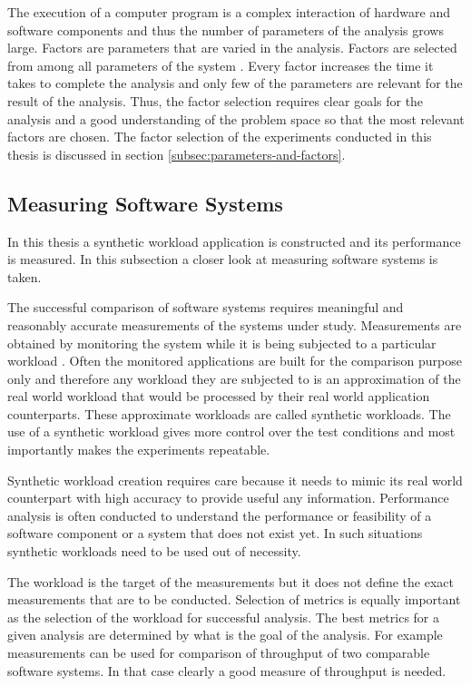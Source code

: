 The execution of a computer program is a complex interaction of hardware and software components and thus the number of parameters of the analysis grows large. Factors are parameters that are varied in the analysis. Factors are selected from among all parameters of the system \cite{jain1991art}. Every factor increases the time it takes to complete the analysis and only few of the parameters are relevant for the result of the analysis. Thus, the factor selection requires clear goals for the analysis and a good understanding of the problem space so that the most relevant factors are chosen. The factor selection of the experiments conducted in this thesis is discussed in section \ref{subsec:parameters-and-factors}.

\subsection{Measuring Software Systems}
\label{subsec:measuring-software}
In this thesis a synthetic workload application is constructed and its performance is measured. In this subsection a closer look at measuring software systems is taken.

The successful comparison of software systems requires meaningful and reasonably accurate measurements of the systems under study. Measurements are obtained by monitoring the system while it is being subjected to a particular workload \cite{jain1991art}. Often the monitored applications are built for the comparison purpose only and therefore any workload they are subjected to is an approximation of the real world workload that would be processed by their real world application counterparts. These approximate workloads are called synthetic workloads. The use of a synthetic workload gives more control over the test conditions and most importantly makes the experiments repeatable.~\cite{jain1991art}

Synthetic workload creation requires care because it needs to mimic its real world counterpart with high accuracy to provide useful any information. Performance analysis is often conducted to understand the performance or feasibility of a software component or a system that does not exist yet. In such situations synthetic workloads need to be used out of necessity.  

The workload is the target of the measurements but it does not define the exact measurements that are to be conducted. Selection of metrics is equally important as the selection of the workload for successful analysis. The best metrics for a given analysis are determined by what is the goal of the analysis. \cite{jain1991art} For example measurements can be used for comparison of throughput of two comparable software systems. In that case clearly a good measure of throughput is needed.

